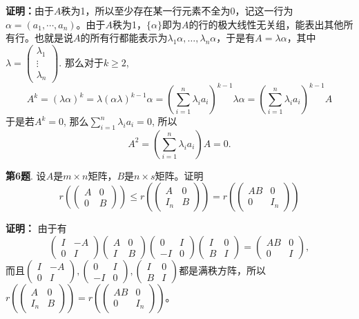 {\bf 证明：}由于$A$秩为1，所以至少存在某一行元素不全为0，记这一行为$\alpha = (a_1, \cdots, a_n)$。由于$A$秩为1，$\{\alpha\}$即为$A$的行的极大线性无关组，能表出其他所有行。也就是说$A$的所有行都能表示为$\lambda_1\alpha, \ldots, \lambda_n\alpha$，于是有$A = \lambda \alpha$，其中$\lambda = \begin{pmatrix}
\lambda_1 \\ \vdots \\ \lambda_n \end{pmatrix}$. 那么对于$k\geqslant 2$,
$$A^k = (\lambda\alpha)^k = \lambda (\alpha\lambda)^{k-1} \alpha = \left( \sum_{i=1}^n \lambda_i a_i \right)^{k-1} \lambda \alpha = \left( \sum_{i=1}^n \lambda_i a_i \right)^{k-1} A$$
于是若$A^k = 0$, 那么$\sum\limits_{i=1}^n \lambda_i a_i = 0$, 所以
$$A^2 = \left( \sum_{i=1}^n \lambda_i a_i \right) A = 0.$$

\newpageorvspace

{\bf 第6题}. 设$A$是$m\times n$矩阵，$B$是$n\times s$矩阵。证明
$$r(\begin{pmatrix} A & 0 \\ 0 & B \end{pmatrix}) \leqslant r(\begin{pmatrix} A & 0 \\ I_n & B \end{pmatrix}) = r(\begin{pmatrix} AB & 0 \\ 0 & I_n \end{pmatrix})$$

{\bf 证明：} 由于有
$$\begin{pmatrix} I & -A \\ 0 & I \end{pmatrix} \begin{pmatrix} A & 0 \\ I & B \end{pmatrix} \begin{pmatrix} 0 & I \\ -I & 0 \end{pmatrix} \begin{pmatrix} I & 0 \\ B & I \end{pmatrix} = \begin{pmatrix} AB & 0 \\ 0 & I \end{pmatrix},$$
而且$\begin{pmatrix} I & -A \\ 0 & I \end{pmatrix}, \begin{pmatrix} 0 & I \\ -I & 0 \end{pmatrix}, \begin{pmatrix} I & 0 \\ B & I \end{pmatrix}$都是满秩方阵，所以$r(\begin{pmatrix} A & 0 \\ I_n & B \end{pmatrix}) = r(\begin{pmatrix} AB & 0 \\ 0 & I_n \end{pmatrix})$。

